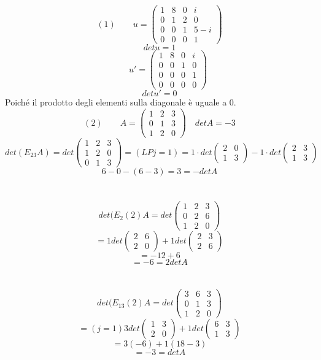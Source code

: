 \documentclass[12pt]{article}
\begin{document}
\[(1) \quad \quad u = \begin{pmatrix}
    1 & 8 & 0 & i\\
    0 & 1 & 2 & 0\\
    0 & 0 & 1 & 5-i\\
    0 & 0 & 0 & 1
\end{pmatrix}\]
\[detu = 1\]
\[\quad \quad u' = \begin{pmatrix}
    1 & 8 & 0 & i\\
    0 & 0 & 1 & 0\\
    0 & 0 & 0 & 1\\
    0 & 0 & 0 & 0
\end{pmatrix}\]
\[detu' = 0\]
Poiché il prodotto degli elementi sulla diagonale è uguale a 0.
\[(2) \quad \quad A = \begin{pmatrix}
    1 & 2 & 3\\
    0 & 1 & 3\\
    1 & 2 & 0
\end{pmatrix} \quad detA = -3\]
\[det(E_{23}A) = det\begin{pmatrix}
    1 & 2 & 3\\
    1 & 2 & 0\\
    0 & 1 & 3
\end{pmatrix} = (LP j = 1) = 1 \cdot det\begin{pmatrix}
    2 & 0\\
    1 & 3
\end{pmatrix} - 1 \cdot det \begin{pmatrix}
    2 & 3\\
    1 & 3
\end{pmatrix}\]
\[6 - 0 - (6 - 3) = 3 = -detA\]
\\\\
\[det(E_2(2)A = det \begin{pmatrix}
    1 & 2 & 3\\
    0 & 2 & 6\\
    1 & 2 & 0
\end{pmatrix}\]
\[= 1 det \begin{pmatrix}
    2 & 6\\
    2 & 0
\end{pmatrix} + 1 det \begin{pmatrix}
    2 & 3\\
    2 & 6
\end{pmatrix}\]
\[= -12 + 6\]
\[= -6 = 2detA\]
\\\\
\[det(E_{13}(2)A = det \begin{pmatrix}
    3 & 6 & 3\\
    0 & 1 & 3\\
    1 & 2 & 0
\end{pmatrix}\]
\[= (j = 1) 3 det \begin{pmatrix}
    1 & 3\\
    2 & 0
\end{pmatrix} + 1 det \begin{pmatrix}
    6 & 3\\
    1 & 3
\end{pmatrix}\]
\[= 3(-6) + 1(18-3)\]
\[= -3 = detA\]
\end{document}
